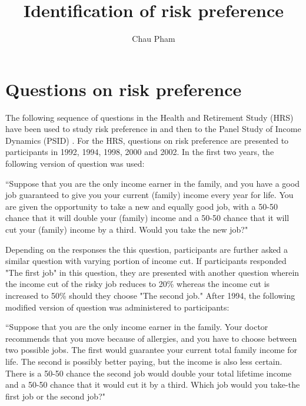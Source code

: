 \documentclass[]{article}
\title{Identification of risk preference}
\author{Chau Pham}
\begin{document}
\onehalfspacing
\maketitle

\section{Questions on risk preference}
The following sequence of questions in the Health and Retirement Study (HRS) have been used to study risk preference in \citet{barsky1997preference} and \citet{kimball2008imputing} then to the Panel Study of Income Dynamics (PSID) \citep{kimball2009risk}. For the HRS, questions on risk preference are presented to participants in 1992, 1994, 1998, 2000 and 2002. In the first two years, the following version of question was used:

\begin{center}
	\begin{minipage}[!h]{.9\linewidth}\small
		``Suppose that you are the only income earner in the family, and you have a good job guaranteed to give you your current (family) income every year for life. You are given the opportunity to take a new and equally good job, with a 50-50 chance that it will double your (family) income and a 50-50 chance that it will cut your (family) income by a third. Would you take the new job?"
	\end{minipage}
\end{center}
Depending on the responses the this question, participants are further asked a similar question with varying portion of income cut. If participants responded "The first job" in this question, they are presented with another question wherein the income cut of the risky job reduces to 20\% whereas the income cut is increased to 50\% should they choose "The second job." After 1994, the following modified version of question was administered to participants:
\begin{center}
	\begin{minipage}[!h]{.9\linewidth}\small
		``Suppose that you are the only income earner in the family. Your doctor recommends that you move because of allergies, and you have to choose between two possible jobs. The first would guarantee your current total family income for life. The second is possibly better paying, but the income is also less certain. There is a 50-50 chance the second job would double your total lifetime income and a 50-50 chance that it would cut it by a third. Which job would you take-the first job or the second job?"
	\end{minipage}
\end{center}
\end{document}
